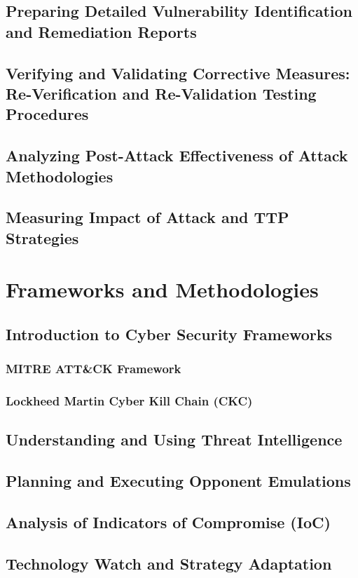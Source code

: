 \documentclass{article}
\begin{document}
\subsection{Preparing Detailed Vulnerability Identification and Remediation Reports}
\subsection{Verifying and Validating Corrective Measures: Re-Verification and Re-Validation Testing Procedures}
\subsection{Analyzing Post-Attack Effectiveness of Attack Methodologies}
\subsection{Measuring Impact of Attack and TTP Strategies}
\section{Frameworks and Methodologies}
\subsection{Introduction to Cyber Security Frameworks}
\subsubsection{MITRE ATT\&CK Framework}
\subsubsection{Lockheed Martin Cyber Kill Chain (CKC)}
\subsection{Understanding and Using Threat Intelligence}
\subsection{Planning and Executing Opponent Emulations}
\subsection{Analysis of Indicators of Compromise (IoC)}
\subsection{Technology Watch and Strategy Adaptation}
\end{document}
